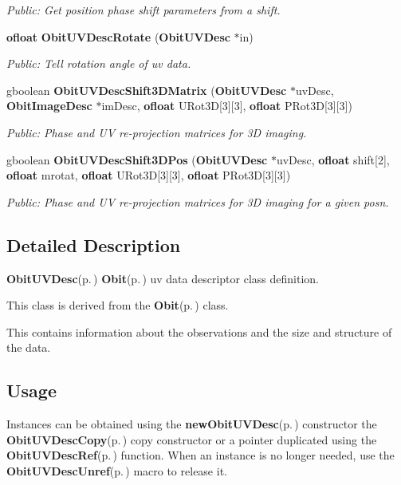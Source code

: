 \begin{CompactItemize}
\begin{CompactList}\small\item\em Public: Get position phase shift parameters from a shift. \item\end{CompactList}\item 
{\bf ofloat} {\bf Obit\-UVDesc\-Rotate} ({\bf Obit\-UVDesc} $\ast$in)
\begin{CompactList}\small\item\em Public: Tell rotation angle of uv data. \item\end{CompactList}\item 
gboolean {\bf Obit\-UVDesc\-Shift3DMatrix} ({\bf Obit\-UVDesc} $\ast$uv\-Desc, {\bf Obit\-Image\-Desc} $\ast$im\-Desc, {\bf ofloat} URot3D[3][3], {\bf ofloat} PRot3D[3][3])
\begin{CompactList}\small\item\em Public: Phase and UV re-projection matrices for 3D imaging. \item\end{CompactList}\item 
gboolean {\bf Obit\-UVDesc\-Shift3DPos} ({\bf Obit\-UVDesc} $\ast$uv\-Desc, {\bf ofloat} shift[2], {\bf ofloat} mrotat, {\bf ofloat} URot3D[3][3], {\bf ofloat} PRot3D[3][3])
\begin{CompactList}\small\item\em Public: Phase and UV re-projection matrices for 3D imaging for a given posn. \item\end{CompactList}\end{CompactItemize}


\subsection{Detailed Description}
{\bf Obit\-UVDesc}{\rm (p.\,\pageref{structObitUVDesc})} {\bf Obit}{\rm (p.\,\pageref{structObit})} uv data descriptor class definition. 

This class is derived from the {\bf Obit}{\rm (p.\,\pageref{structObit})} class.

This contains information about the observations and the size and structure of the data.\subsection{Usage}\label{ObitUVDesc_8h_ObitUVDescUsage}
Instances can be obtained using the {\bf new\-Obit\-UVDesc}{\rm (p.\,\pageref{ObitUVDesc_8c_a9})} constructor the {\bf Obit\-UVDesc\-Copy}{\rm (p.\,\pageref{ObitUVDesc_8c_a11})} copy constructor or a pointer duplicated using the {\bf Obit\-UVDesc\-Ref}{\rm (p.\,\pageref{ObitUVDesc_8h_a1})} function. When an instance is no longer needed, use the {\bf Obit\-UVDesc\-Unref}{\rm (p.\,\pageref{ObitUVDesc_8h_a0})} macro to release it.

